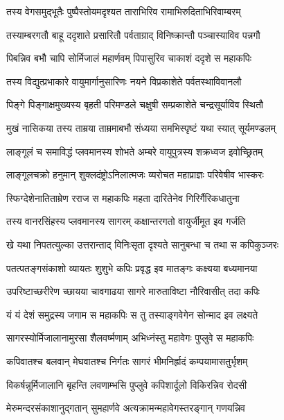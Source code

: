\twolineshloka
{तस्य वेगसमुद्भूतैः पुष्पैस्तोयमदृश्यत}
{ताराभिरिव रामाभिरुदिताभिरिवाम्बरम्} %

\twolineshloka
{तस्याम्बरगतौ बाहू ददृशाते प्रसारितौ}
{पर्वताग्राद् विनिष्क्रान्तौ पञ्चास्याविव पन्नगौ} %

\twolineshloka
{पिबन्निव बभौ चापि सोर्मिजालं महार्णवम्}
{पिपासुरिव चाकाशं ददृशे स महाकपिः} %

\twolineshloka
{तस्य विद्युत्प्रभाकारे वायुमार्गानुसारिणः}
{नयने विप्रकाशेते पर्वतस्थाविवानलौ} %

\twolineshloka
{पिङ्गे पिङ्गाक्षमुख्यस्य बृहती परिमण्डले}
{चक्षुषी सम्प्रकाशेते चन्द्रसूर्याविव स्थितौ} %

\twolineshloka
{मुखं नासिकया तस्य ताम्रया ताम्रमाबभौ}
{संध्यया समभिस्पृष्टं यथा स्यात् सूर्यमण्डलम्} %

\twolineshloka
{लाङ्गूलं च समाविद्धं प्लवमानस्य शोभते}
{अम्बरे वायुपुत्रस्य शक्रध्वज इवोच्छ्रितम्} %

\twolineshloka
{लाङ्गूलचक्रो हनुमान् शुक्लदंष्ट्रोऽनिलात्मजः}
{व्यरोचत महाप्राज्ञः परिवेषीव भास्करः} %

\twolineshloka
{स्फिग्देशेनातिताम्रेण रराज स महाकपिः}
{महता दारितेनेव गिरिर्गैरिकधातुना} %

\twolineshloka
{तस्य वानरसिंहस्य प्लवमानस्य सागरम्}
{कक्षान्तरगतो वायुर्जीमूत इव गर्जति} %

\twolineshloka
{खे यथा निपतत्युल्का उत्तरान्ताद् विनिःसृता}
{दृश्यते सानुबन्धा च तथा स कपिकुञ्जरः} %

\twolineshloka
{पतत्पतङ्गसंकाशो व्यायतः शुशुभे कपिः}
{प्रवृद्ध इव मातङ्गः कक्ष्यया बध्यमानया} %

\twolineshloka
{उपरिष्टाच्छरीरेण च्छायया चावगाढया}
{सागरे मारुताविष्टा नौरिवासीत् तदा कपिः} %

\twolineshloka
{यं यं देशं समुद्रस्य जगाम स महाकपिः}
{स तु तस्याङ्गवेगेन सोन्माद इव लक्ष्यते} %

\twolineshloka
{सागरस्योर्मिजालानामुरसा शैलवर्ष्मणाम्}
{अभिध्नंस्तु महावेगः पुप्लुवे स महाकपिः} %

\twolineshloka
{कपिवातश्च बलवान् मेघवातश्च निर्गतः}
{सागरं भीमनिर्ह्रादं कम्पयामासतुर्भृशम्} %

\twolineshloka
{विकर्षन्नूर्मिजालानि बृहन्ति लवणाम्भसि}
{पुप्लुवे कपिशार्दूलो विकिरन्निव रोदसी} %

\twolineshloka
{मेरुमन्दरसंकाशानुद्गतान् सुमहार्णवे}
{अत्यक्रामन्महावेगस्तरङ्गान् गणयन्निव} %

